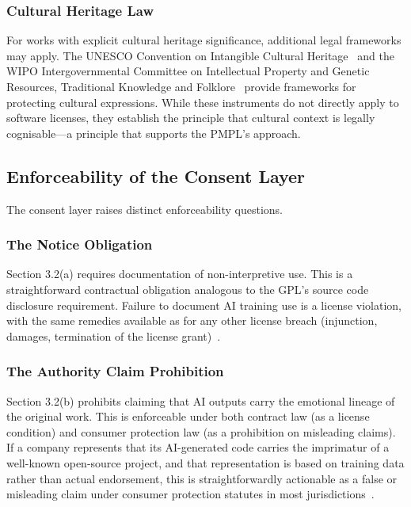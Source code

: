 \documentclass[11pt,twocolumn]{article}
\begin{document}
\subsubsection{Cultural Heritage Law}

For works with explicit cultural heritage significance, additional legal
frameworks may apply. The UNESCO Convention on Intangible Cultural
Heritage~\cite{unesco2003} and the WIPO Intergovernmental Committee on
Intellectual Property and Genetic Resources, Traditional Knowledge and
Folklore~\cite{wipo-tk} provide frameworks for protecting cultural
expressions. While these instruments do not directly apply to software
licenses, they establish the principle that cultural context is legally
cognisable---a principle that supports the PMPL's approach.

\subsection{Enforceability of the Consent Layer}

The consent layer raises distinct enforceability questions.

\subsubsection{The Notice Obligation}

Section 3.2(a) requires documentation of non-interpretive use. This is
a straightforward contractual obligation analogous to the GPL's source
code disclosure requirement. Failure to document AI training use is a
license violation, with the same remedies available as for any other
license breach (injunction, damages, termination of the license
grant)~\cite{jacobsen2008}.

\subsubsection{The Authority Claim Prohibition}

Section 3.2(b) prohibits claiming that AI outputs carry the emotional
lineage of the original work. This is enforceable under both contract
law (as a license condition) and consumer protection law (as a
prohibition on misleading claims). If a company represents that its
AI-generated code carries the imprimatur of a well-known open-source
project, and that representation is based on training data rather than
actual endorsement, this is straightforwardly actionable as a false or
misleading claim under consumer protection statutes in most
jurisdictions~\cite{ftc-act}.
\end{document}
